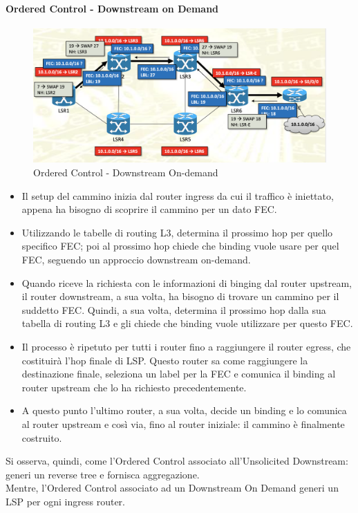 \documentclass{article}
\begin{document}
\paragraph{Ordered Control - Downstream on Demand}

\begin{figure}[H]
    \centering
    \includegraphics[scale=0.4]{figures/ordered control downstream on-demand.png}
    \caption{Ordered Control - Downstream On-demand}
\end{figure}

\begin{itemize}
    \item Il setup del cammino inizia dal router ingress da cui il traffico è iniettato, appena ha bisogno di scoprire il cammino per un dato FEC.
    \item Utilizzando le tabelle di routing L3, determina il prossimo hop per quello specifico FEC; poi al prossimo hop chiede che binding vuole usare per quel FEC, seguendo un approccio downstream on-demand.
    \item Quando riceve la richiesta con le informazioni di binging dal router upstream, il router downstream, a sua volta, ha bisogno di trovare un cammino per il suddetto FEC. Quindi, a sua volta, determina il prossimo hop dalla sua tabella di routing L3 e gli chiede che binding vuole utilizzare per questo FEC.
    \item Il processo è ripetuto per tutti i router fino a raggiungere il router egress, che costituirà l'hop finale di LSP. Questo router sa come raggiungere la destinazione finale, seleziona un label per la FEC e comunica il binding al router upstream che lo ha richiesto precedentemente.
    \item A questo punto l'ultimo router, a sua volta, decide un binding e lo comunica al router upstream e così via, fino al router iniziale: il cammino è finalmente costruito.
\end{itemize}
Si osserva, quindi, come l'Ordered Control associato all'Unsolicited Downstream: generi un reverse tree e fornisca aggregazione. \\ Mentre, l'Ordered Control associato ad un Downstream On Demand generi un LSP per ogni ingress router.
\end{document}

